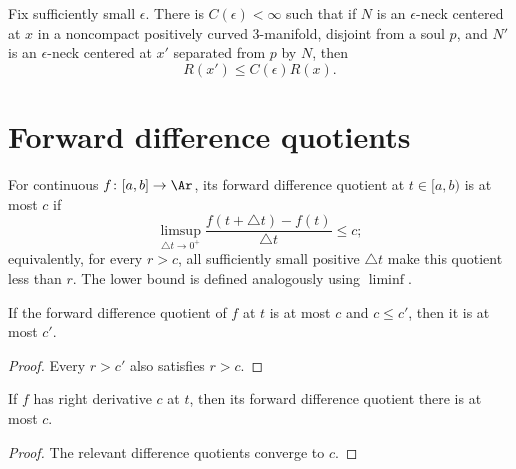 \begin{corollary}
\label{cor:epsilon-neck-scale-bound}
\label{strnarrows}

Fix sufficiently small $\epsilon$. There is $C(\epsilon)<\infty$ such
that if $N$ is an $\epsilon$-neck centered at $x$ in a noncompact
positively curved $3$-manifold, disjoint from a soul $p$, and $N'$ is
an $\epsilon$-neck centered at $x'$ separated from $p$ by $N$, then
$$R(x')\le C(\epsilon)R(x).$$
\end{corollary}

\section{Forward difference quotients}

\begin{definition}
\label{def:forward-difference-quotient}
\leanok



For continuous $f\colon[a,b]\to\Ar$, its forward difference quotient
at $t\in[a,b)$ is at most $c$ if
$$\limsup_{\triangle t\to0^+}
\frac{f(t+\triangle t)-f(t)}{\triangle t}\le c;$$
equivalently, for every $r>c$, all sufficiently small positive
$\triangle t$ make this quotient less than $r$. The lower bound is
defined analogously using $\liminf$.
\end{definition}

\begin{lemma}
\label{lem:forward-difference-quotient-mono}
\leanok



If the forward difference quotient of $f$ at $t$ is at most $c$ and
$c\le c'$, then it is at most $c'$.
\end{lemma}
\begin{proof}
\sketch
\leanok
Every $r>c'$ also satisfies $r>c$.
\end{proof}

\begin{lemma}
\label{lem:right-derivative-forward-difference-quotient}
\leanok



If $f$ has right derivative $c$ at $t$, then its forward difference
quotient there is at most $c$.
\end{lemma}
\begin{proof}
\sketch
\leanok
The relevant difference quotients converge to $c$.
\end{proof}

